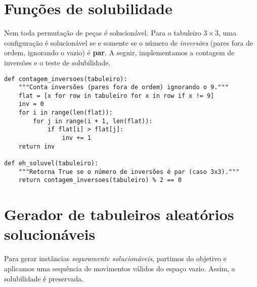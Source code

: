 
\section{Funções de solubilidade}

Nem toda permutação de peças é solucionável. Para o tabuleiro $3\times 3$, uma configuração é solucionável se e somente se o número de \emph{inversões} (pares fora de ordem, ignorando o vazio) é \textbf{par}. A seguir, implementamos a contagem de inversões e o teste de solubilidade.

\begin{verbatim}
def contagem_inversoes(tabuleiro):
    """Conta inversões (pares fora de ordem) ignorando o 9."""
    flat = [x for row in tabuleiro for x in row if x != 9]
    inv = 0
    for i in range(len(flat)):
        for j in range(i + 1, len(flat)):
            if flat[i] > flat[j]:
                inv += 1
    return inv

def eh_soluvel(tabuleiro):
    """Retorna True se o número de inversões é par (caso 3x3)."""
    return contagem_inversoes(tabuleiro) % 2 == 0
\end{verbatim}


\section{Gerador de tabuleiros aleatórios solucionáveis}

Para gerar instâncias \emph{seguramente solucionáveis}, partimos do objetivo e aplicamos uma sequência de movimentos válidos do espaço vazio. Assim, a solubilidade é preservada.

